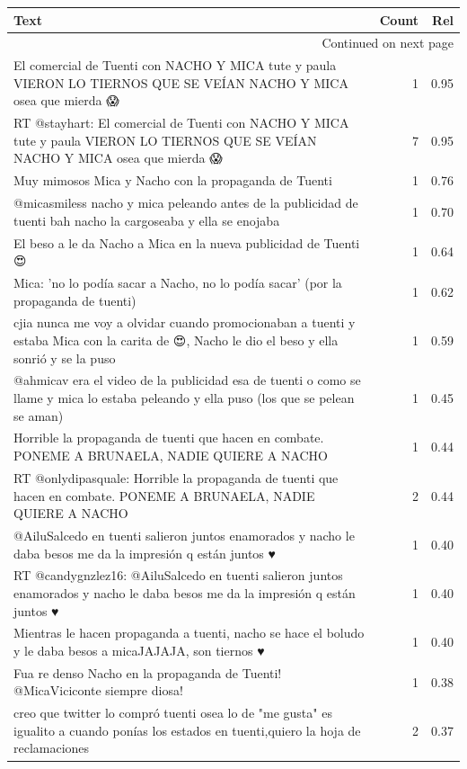 \begin{longtable}{p{12.5cm}rr}
\toprule
Text & Count & Rel \\
\midrule
\endhead
\midrule
\multicolumn{3}{r}{{Continued on next page}} \\
\midrule
\endfoot

\bottomrule
\endlastfoot
El comercial de Tuenti con NACHO Y MICA tute y paula VIERON LO TIERNOS QUE SE VEÍAN NACHO Y MICA osea que mierda 😱 & 1 & 0.95 \\
RT @stayhart: El comercial de Tuenti con NACHO Y MICA tute y paula VIERON LO TIERNOS QUE SE VEÍAN NACHO Y MICA osea que mierda 😱 & 7 & 0.95 \\
Muy mimosos Mica y Nacho con la propaganda de Tuenti & 1 & 0.76 \\
@micasmiless nacho y mica peleando antes de la publicidad de tuenti bah nacho la cargoseaba y ella se enojaba & 1 & 0.70 \\
El beso a le da Nacho a Mica en la nueva publicidad de Tuenti 😍 & 1 & 0.64 \\
Mica: 'no lo podía sacar a Nacho, no lo podía sacar' (por la propaganda de tuenti) & 1 & 0.62 \\
cjia nunca me voy a olvidar cuando promocionaban a tuenti y estaba Mica con la carita de 😍, Nacho le dio el beso y ella sonrió y se la puso & 1 & 0.59 \\
@ahmicav era el video de la publicidad esa de tuenti o como se llame y mica lo estaba peleando y ella puso (los que se pelean se aman) & 1 & 0.45 \\
Horrible la propaganda de tuenti que hacen en combate. PONEME A BRUNAELA, NADIE QUIERE A NACHO & 1 & 0.44 \\
RT @onlydipasquale: Horrible la propaganda de tuenti que hacen en combate. PONEME A BRUNAELA, NADIE QUIERE A NACHO & 2 & 0.44 \\
@AiluSalcedo  en tuenti salieron juntos enamorados y nacho le daba besos me da la impresión q están juntos ♥ & 1 & 0.40 \\
RT @candygnzlez16: @AiluSalcedo  en tuenti salieron juntos enamorados y nacho le daba besos me da la impresión q están juntos ♥ & 1 & 0.40 \\
Mientras le hacen propaganda a tuenti, nacho se hace el boludo y le daba besos a micaJAJAJA, son tiernos ♥ & 1 & 0.40 \\
Fua re denso Nacho en la propaganda de Tuenti! @MicaViciconte siempre diosa! & 1 & 0.38 \\
creo que twitter lo compró tuenti osea lo de "me gusta" es igualito a cuando ponías los estados en tuenti,quiero la hoja de reclamaciones & 2 & 0.37 \\

\end{longtable}
